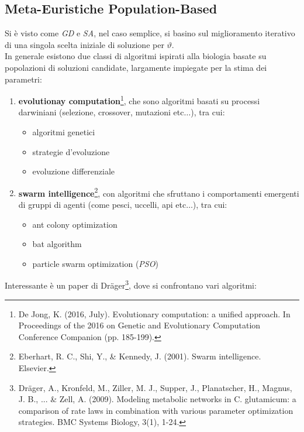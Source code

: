 \documentclass[a4paper,12pt, oneside]{book}
\begin{document}
\subsection{Meta-Euristiche Population-Based}
Si è visto come \textit{GD} e \textit{SA}, nel caso semplice, si basino sul
miglioramento iterativo di una singola scelta iniziale di soluzione per
$\vartheta$. \\
In generale esistono due classi di algoritmi ispirati alla biologia basate su
popolazioni di soluzioni candidate, largamente impiegate per la stima dei
parametri:
\begin{enumerate}
  \item \textbf{evolutionay computation}\footnote{De Jong, K. (2016,
    July). Evolutionary computation: a unified approach. In Proceedings of the
    2016 on Genetic and Evolutionary Computation Conference Companion
    (pp. 185-199).}, che sono algoritmi basati su processi 
  darwiniani (selezione, crossover, mutazioni etc$\ldots$), tra cui:
  \begin{itemize}
    \item algoritmi genetici
    \item strategie d'evoluzione
    \item evoluzione differenziale
  \end{itemize}
  \item \textbf{swarm intelligence}\footnote{Eberhart, R. C., Shi, Y., \&
    Kennedy, J. (2001). Swarm intelligence. Elsevier.}, con algoritmi che
  sfruttano i comportamenti emergenti di gruppi di agenti (come pesci, uccelli,
  api etc$\ldots$), tra cui:
  \begin{itemize}
    \item ant colony optimization
    \item bat algorithm
    \item particle swarm optimization (\textit{PSO})
  \end{itemize}
\end{enumerate}
Interessante è un paper di Dr\"{a}ger\footnote{Dr\"{a}ger, A., Kronfeld, M.,
  Ziller, 
  M. J., Supper, J., Planatscher, H., Magnus, J. B., ... \& Zell,
  A. (2009). Modeling metabolic networks in C. glutamicum: a comparison of rate
  laws in combination with various parameter optimization strategies. BMC
  Systems Biology, 3(1), 1-24.}, dove si confrontano vari algoritmi: 
\end{document}
